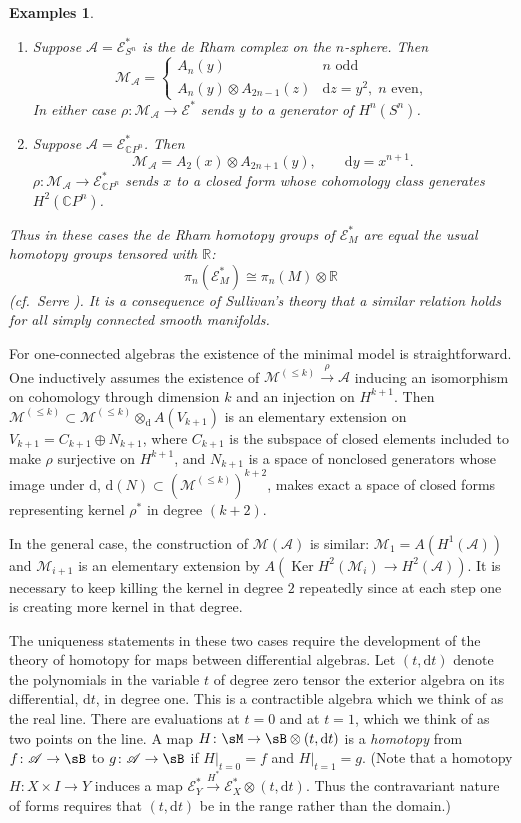 \documentclass[11pt]{amsart}
\theoremstyle{plain}
\newtheorem{examples}[theorem]{Examples}
\theoremstyle{definition}
\DeclareMathOperator{\Ker}{Ker}
\newcommand{\sA}{\mathscr{A}}
\newcommand{\sE}{\mathscr{E}}
\newcommand{\cM}{\mathcal{M}}
\newcommand{\dd}{\mathrm{d}}
\newcommand{\CC}{\mathbb{C}}
\newcommand{\RR}{\mathbb{R}}
\begin{document}
\begin{examples}%
\begin{enumerate}
\item[1)] Suppose $\sA = \sE^{*}_{S^{n}}$ is the de Rham complex on the $n$-sphere. Then
\[
\cM_{\sA} = \begin{cases}
A_{n}(y) & n \text{ odd} \\[1mm]
A_{n}(y) \otimes A_{2n-1}(z) & \dd z = y^{2},\; n \text{ even},
\end{cases}
\]
In either case $\rho \colon \cM_{\sA} \to \sE^{*}$ sends $y$ to a generator of $H^{n}(S^{n})$.
\item[2)] Suppose $\sA = \sE^{*}_{\CC P^{n}}$. Then
\[
\cM_{\sA} = A_{2}(x) \otimes A_{2n+1}(y), \qquad \dd y = x^{n+1}.
\]
$\rho \colon \cM_{\sA} \to \sE^{*}_{\CC P^{n}}$ sends $x$ to a closed form whose cohomology class generates $H^{2}(\CC P^{n})$.
\end{enumerate}
Thus in these cases the de Rham homotopy groups of $\sE^{*}_{M}$ are equal the usual homotopy groups tensored with $\RR$:
\[
\pi_{n}(\sE^{*}_{M}) \cong \pi_{n}(M) \otimes \RR
\]
(cf.\ Serre \cite{Se}). It is a consequence of Sullivan's theory that a similar relation holds for all simply connected smooth manifolds.
\end{examples}

For one-connected algebras the existence of the minimal model is straightforward. One inductively assumes the existence of $\cM^{(\le k)} \xrightarrow{\rho} \sA$ inducing an isomorphism on cohomology through dimension $k$ and an injection on $H^{k+1}$. Then $\cM^{(\le k)} \subset \cM^{(\le k)} \otimes_{\dd} A(V_{k+1})$ is an elementary extension on $V_{k+1} = C_{k+1} \oplus N_{k+1}$, where $C_{k+1}$ is the subspace of closed elements included to make $\rho$ surjective on $H^{k+1}$, and $N_{k+1}$ is a space of nonclosed generators whose image under $\dd$, $\dd(N) \subset (\cM^{(\le k)})^{k+2}$, makes exact a space of closed forms representing kernel $\rho^{*}$ in degree $(k+2)$.

In the general case, the construction of $\cM(\sA)$ is similar: $\cM_{1} = A(H^{1}(\sA))$ and $\cM_{i+1}$ is an elementary extension by $A(\Ker H^{2}(\cM_{i}) \to H^{2}(\sA))$. It is necessary to keep killing the kernel in degree $2$ repeatedly since at each step one is creating more kernel in that degree.

The uniqueness statements in these two cases require the development of the theory of homotopy for maps between differential algebras. Let $(t, \dd t)$ denote the polynomials in the variable $t$ of degree zero tensor the exterior algebra on its differential, $\dd t$, in degree one. This is a contractible algebra which we think of as the real line. There are evaluations at $t=0$ and at $t=1$, which we think of as two points on the line. A map $H \colon \sM \to \sB \otimes (t, \dd t)$ is a \emph{homotopy} from $f \colon \sA \to \sB$ to $g \colon \sA \to \sB$ if $H|_{t=0} = f$ and $H|_{t=1} = g$. (Note that a homotopy $H \colon X \times I \to Y$ induces a map $\sE^{*}_{Y} \xrightarrow{H^{*}} \sE^{*}_{X} \otimes (t, \dd t)$. Thus the contravariant nature of forms requires that $(t, \dd t)$ be in the range rather than the domain.)
\end{document}
